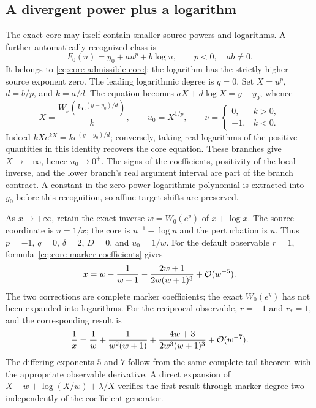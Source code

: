 \subsection{A divergent power plus a logarithm}

The exact core may itself contain smaller source powers and logarithms.
A further automatically recognized class is
\begin{equation}
 F_0(u)=y_0+a u^p+b\log u,\qquad p<0,\quad ab\ne0.
 \label{eq:core-power-plus-log}
\end{equation}
It belongs to \eqref{eq:core-admissible-core}: the logarithm has the
strictly higher source exponent zero. The leading logarithmic degree is
$q=0$. Set $X=u^p$, $d=b/p$, and $k=a/d$. The equation becomes
$aX+d\log X=y-y_0$, whence
\begin{equation}
 X=\frac{W_\nu\!\left(k e^{(y-y_0)/d}\right)}{k},\qquad
 u_0=X^{1/p},\qquad
 \nu=\begin{cases}0,&k>0,\\-1,&k<0.\end{cases}
 \label{eq:core-power-plus-log-inverse}
\end{equation}
Indeed $kX e^{kX}=k e^{(y-y_0)/d}$; conversely, taking real logarithms
of the positive quantities in this identity recovers the core equation.
These branches give $X\to+\infty$, hence $u_0\to0^+$. The signs of the
coefficients, positivity of the local inverse, and the lower branch's
real argument interval are part of the branch contract. A constant in the
zero-power logarithmic polynomial is extracted into $y_0$ before this
recognition, so affine target shifts are preserved.

\begin{example}
\label{ex:core-power-plus-log-correction}
As $x\to+\infty$, retain the exact inverse
$w=W_0(e^y)$ of $x+\log x$. The source coordinate is $u=1/x$;
the core is $u^{-1}-\log u$ and the perturbation is $u$. Thus
$p=-1$, $q=0$, $\delta=2$, $D=0$, and $u_0=1/w$.
For the default observable $r=1$, formula~\eqref{eq:core-marker-coefficients}
gives
\begin{equation}
 x=w-\frac{1}{w+1}
       -\frac{2w+1}{2w(w+1)^3}
       +\mathcal O(w^{-5}).
 \label{eq:core-power-plus-log-expansion}
\end{equation}
The two corrections are complete marker coefficients; the exact $W_0(e^y)$
has not been expanded into logarithms. For the reciprocal observable,
$r=-1$ and $r_*=1$, and the corresponding result is
\begin{equation}
 \frac1x=\frac1w+\frac{1}{w^2(w+1)}
       +\frac{4w+3}{2w^3(w+1)^3}
       +\mathcal O(w^{-7}).
 \label{eq:core-power-plus-log-reciprocal}
\end{equation}
The differing exponents $5$ and $7$ follow from the same complete-tail
theorem with the appropriate observable derivative. A direct expansion
of $X-w+\log(X/w)+\lambda/X$ verifies the first result through marker
degree two independently of the coefficient generator.
\end{example}

